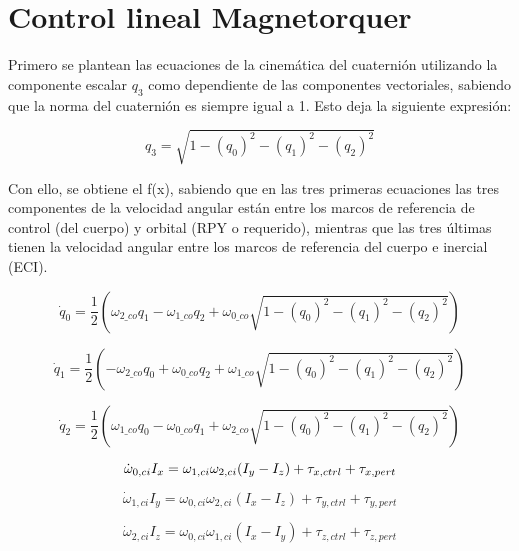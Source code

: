 \section{Control lineal Magnetorquer}
\label{ap:Z5}

Primero se plantean las ecuaciones de la cinemática del cuaternión utilizando la componente escalar \( q_3 \) como dependiente de las componentes vectoriales, sabiendo que la norma del cuaternión es siempre igual a 1. Esto deja la siguiente expresión:

\[
q_3 = \sqrt{1 - (q_0)^2 - (q_1)^2 - (q_2)^2}
\]

Con ello, se obtiene el f(x), sabiendo que en las tres primeras ecuaciones las tres componentes de la velocidad angular están entre los marcos de referencia de control (del cuerpo) y orbital (RPY o requerido), mientras que las tres últimas tienen la velocidad angular entre los marcos de referencia del cuerpo e inercial (ECI).

\begin{equation}
	\dot{q}_0 = \frac{1}{2} \left( \omega_{2\_co} q_1 - \omega_{1\_co} q_2 + \omega_{0\_co} \sqrt{1 - (q_0)^2 - (q_1)^2 - (q_2)^2} \right)
\end{equation}

\begin{equation}
	\dot{q}_1 = \frac{1}{2} \left( -\omega_{2\_co} q_0 + \omega_{0\_co} q_2 + \omega_{1\_co} \sqrt{1 - (q_0)^2 - (q_1)^2 - (q_2)^2} \right)
\end{equation}

\begin{equation}
	\dot{q}_2 = \frac{1}{2} \left( \omega_{1\_co} q_0 - \omega_{0\_co} q_1 + \omega_{2\_co} \sqrt{1 - (q_0)^2 - (q_1)^2 - (q_2)^2} \right)
\end{equation}

\begin{equation}
	\dot{\omega}_{0,ci} I_x = \omega_{1,ci} \omega_{2,ci} (I_y - I_z) + \tau_{x,ctrl} + \tau_{x,pert} \\
\end{equation}

\begin{equation}
	\dot{\omega}_{1,ci} I_y = \omega_{0,ci} \omega_{2,ci} (I_x - I_z) + \tau_{y,ctrl} + \tau_{y,pert}
\end{equation}

\begin{equation}
	\dot{\omega}_{2,ci} I_z = \omega_{0,ci} \omega_{1,ci} (I_x - I_y) + \tau_{z,ctrl} + \tau_{z,pert}
\end{equation}


